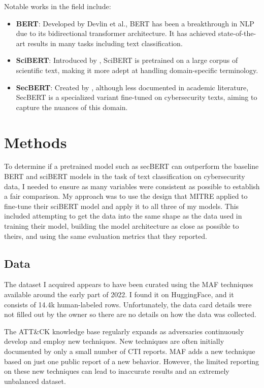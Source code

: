 \documentclass[11pt]{article}
\begin{document}
Notable works in the field include:

\begin{itemize}
	\item \textbf{BERT}: Developed by \cite{devlin2018bert}Devlin et al., BERT has been a breakthrough in NLP due to its bidirectional transformer architecture. It has achieved state-of-the-art results in many tasks including text classification.
	\item \textbf{SciBERT}: Introduced by \cite{beltagy2019scibert}, SciBERT is pretrained on a large corpus of scientific text, making it more adept at handling domain-specific terminology.
        \item \textbf{SecBERT}: Created by \cite{secBERT}, although less documented in academic literature, SecBERT is a specialized variant fine-tuned on cybersecurity texts, aiming to capture the nuances of this domain.
\end{itemize}

\section{Methods}

To determine if a pretrained model such as secBERT can outperform the baseline BERT and sciBERT models in the task of text classification on cybersecurity data, I needed to ensure as many variables were consistent as possible to establish a fair comparison. My approach was to use the design that MITRE applied to fine-tune their sciBERT model and apply it to all three of my models. This included attempting to get the data into the same shape as the data used in training their model, building the model architecture as close as possible to theirs, and using the same evaluation metrics that they reported. 

\subsection{Data}

The dataset I acquired appears to have been curated using the MAF techniques available around the early part of 2022. I found it on HuggingFace, and it consists of 14.4k human-labeled rows. Unfortunately, the data card details were not filled out by the owner \cite{data} so there are no details on how the data was collected. 

The ATT\&CK knowledge base regularly expands as adversaries continuously develop and employ new techniques. New techniques are often initially documented by only a small number of CTI reports. MAF adds a new technique based on just one public report of a new behavior. However, the limited reporting on these new techniques can lead to inaccurate results and an extremely unbalanced dataset.
\end{document}

